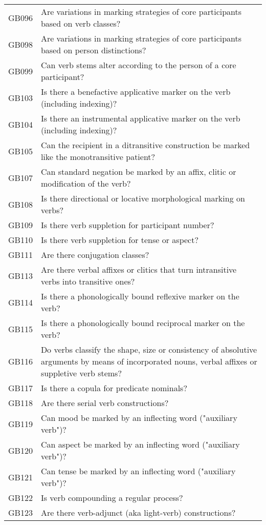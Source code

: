 \begin{longtable}{p{3cm}p{12cm}}
  GB096 & Are variations in marking strategies of core participants based on verb classes? \\ 
  GB098 & Are variations in marking strategies of core participants based on person distinctions? \\ 
  GB099 & Can verb stems alter according to the person of a core participant? \\ 
  GB103 & Is there a benefactive applicative marker on the verb (including indexing)? \\ 
  GB104 & Is there an instrumental applicative marker on the verb (including indexing)? \\ 
  GB105 & Can the recipient in a ditransitive construction be marked like the monotransitive patient? \\ 
  GB107 & Can standard negation be marked by an affix, clitic or modification of the verb? \\ 
  GB108 & Is there directional or locative morphological marking on verbs? \\ 
  GB109 & Is there verb suppletion for participant number? \\ 
  GB110 & Is there verb suppletion for tense or aspect? \\ 
  GB111 & Are there conjugation classes? \\ 
  GB113 & Are there verbal affixes or clitics that turn intransitive verbs into transitive ones? \\ 
  GB114 & Is there a phonologically bound reflexive marker on the verb? \\ 
  GB115 & Is there a phonologically bound reciprocal marker on the verb? \\ 
  GB116 & Do verbs classify the shape, size or consistency of absolutive arguments by means of incorporated nouns, verbal affixes or suppletive verb stems? \\ 
  GB117 & Is there a copula for predicate nominals? \\ 
  GB118 & Are there serial verb constructions? \\ 
  GB119 & Can mood be marked by an inflecting word ("auxiliary verb")? \\ 
  GB120 & Can aspect be marked by an inflecting word ("auxiliary verb")? \\ 
  GB121 & Can tense be marked by an inflecting word ("auxiliary verb")? \\ 
  GB122 & Is verb compounding a regular process? \\ 
  GB123 & Are there verb-adjunct (aka light-verb) constructions? \\ 

\end{longtable}
